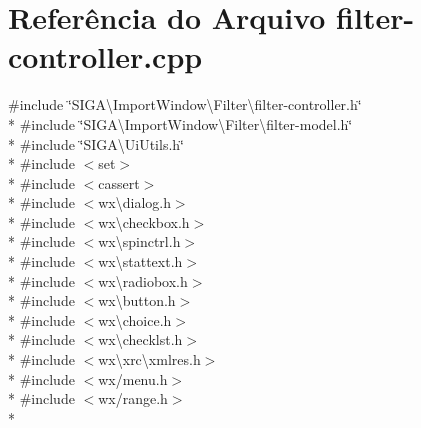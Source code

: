 \section{Referência do Arquivo filter-\/controller.cpp}
\label{filter-controller_8cpp}
{\ttfamily \#include \char`\"{}S\+I\+G\+A\textbackslash{}\+Import\+Window\textbackslash{}\+Filter\textbackslash{}filter-\/controller.\+h\char`\"{}}\\*
{\ttfamily \#include \char`\"{}S\+I\+G\+A\textbackslash{}\+Import\+Window\textbackslash{}\+Filter\textbackslash{}filter-\/model.\+h\char`\"{}}\\*
{\ttfamily \#include \char`\"{}S\+I\+G\+A\textbackslash{}\+Ui\+Utils.\+h\char`\"{}}\\*
{\ttfamily \#include $<$set$>$}\\*
{\ttfamily \#include $<$cassert$>$}\\*
{\ttfamily \#include $<$wx\textbackslash{}dialog.\+h$>$}\\*
{\ttfamily \#include $<$wx\textbackslash{}checkbox.\+h$>$}\\*
{\ttfamily \#include $<$wx\textbackslash{}spinctrl.\+h$>$}\\*
{\ttfamily \#include $<$wx\textbackslash{}stattext.\+h$>$}\\*
{\ttfamily \#include $<$wx\textbackslash{}radiobox.\+h$>$}\\*
{\ttfamily \#include $<$wx\textbackslash{}button.\+h$>$}\\*
{\ttfamily \#include $<$wx\textbackslash{}choice.\+h$>$}\\*
{\ttfamily \#include $<$wx\textbackslash{}checklst.\+h$>$}\\*
{\ttfamily \#include $<$wx\textbackslash{}xrc\textbackslash{}xmlres.\+h$>$}\\*
{\ttfamily \#include $<$wx/menu.\+h$>$}\\*
{\ttfamily \#include $<$wx/range.\+h$>$}\\*
